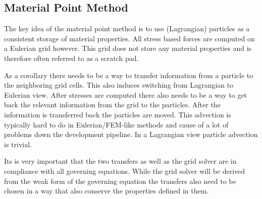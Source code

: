 \documentclass[m,times]{cgMA}
\begin{document}
\subsection{Material Point Method}\label{sec:mat_point}
The key idea of the material point method is to use (Lagrangian) particles as a consistent storage of material properties. All stress based forces are computed on a Eulerian grid however. This grid does not store any material properties and is therefore often referred to as a scratch pad.

As a corollary there needs to be a way to transfer information from a particle to the neighboring grid cells. This also induces switching from Lagrangian to Eulerian view. After stresses are computed there also needs to be a way to get back the relevant information from the grid to the particles. After the information is transferred back the particles are moved. This advection is typically hard to do in Eulerian/FEM-like methods and cause of a lot of problems down the development pipeline. In a Lagrangian view particle advection is trivial.

Its is very important that the two transfers as well as the grid solver are in compliance with all governing equations. While the grid solver will be derived from the weak form of the governing equation the transfers also need to be chosen in a way that also conserve the properties defined in them.
\cite{MPM:COURSE}
\end{document}
